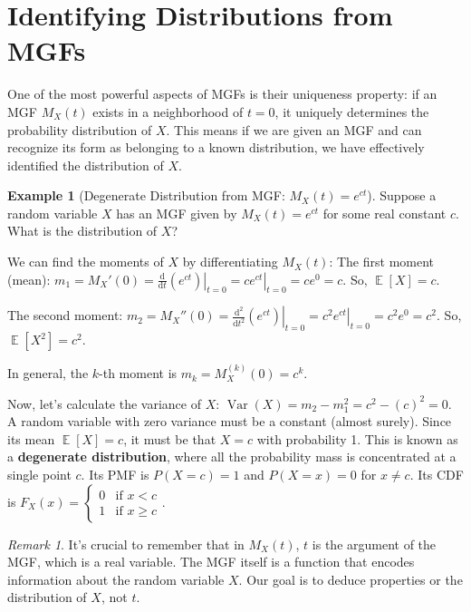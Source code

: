 \documentclass[11pt, letterpaper]{article}
\theoremstyle{plain} %
\theoremstyle{definition} %
\newtheorem{example}[theorem]{Example}
\theoremstyle{remark} %
\newtheorem{remark}[theorem]{Remark}
\DeclareMathOperator{\E}{\mathbb{E}}
\DeclareMathOperator{\Var}{\mathrm{Var}}
\newcommand{\dee}{\mathrm{d}} %
\begin{document}
\section{Identifying Distributions from MGFs}
\label{sec:identifying_dist_mgf}

One of the most powerful aspects of MGFs is their uniqueness property: if an MGF $M_X(t)$ exists in a neighborhood of $t=0$, it uniquely determines the probability distribution of $X$. This means if we are given an MGF and can recognize its form as belonging to a known distribution, we have effectively identified the distribution of $X$.

\begin{example}[Degenerate Distribution from MGF: $M_X(t) = e^{ct}$]
\label{ex:mgf_degenerate}
Suppose a random variable $X$ has an MGF given by $M_X(t) = e^{ct}$ for some real constant $c$. What is the distribution of $X$?

We can find the moments of $X$ by differentiating $M_X(t)$:
The first moment (mean):
$m_1 = M_X'(0) = \left. \frac{\dee}{\dee t} (e^{ct}) \right|_{t=0} = \left. c e^{ct} \right|_{t=0} = c e^0 = c$.
So, $\E[X] = c$.

The second moment:
$m_2 = M_X''(0) = \left. \frac{\dee^2}{\dee t^2} (e^{ct}) \right|_{t=0} = \left. c^2 e^{ct} \right|_{t=0} = c^2 e^0 = c^2$.
So, $\E[X^2] = c^2$.

In general, the $k$-th moment is $m_k = M_X^{(k)}(0) = c^k$.

Now, let's calculate the variance of $X$:
$\Var(X) = m_2 - m_1^2 = c^2 - (c)^2 = 0$.
A random variable with zero variance must be a constant (almost surely). Since its mean $\E[X] = c$, it must be that $X=c$ with probability 1.
This is known as a \textbf{degenerate distribution}, where all the probability mass is concentrated at a single point $c$.
Its PMF is $P(X=c)=1$ and $P(X=x)=0$ for $x \ne c$.
Its CDF is $F_X(x) = \begin{cases} 0 & \text{if } x < c \\ 1 & \text{if } x \ge c \end{cases}$.
\begin{remark}
    It's crucial to remember that in $M_X(t)$, $t$ is the argument of the MGF, which is a real variable. The MGF itself is a function that encodes information about the random variable $X$. Our goal is to deduce properties or the distribution of $X$, not $t$.
\end{remark}
\end{example}
\end{document}
